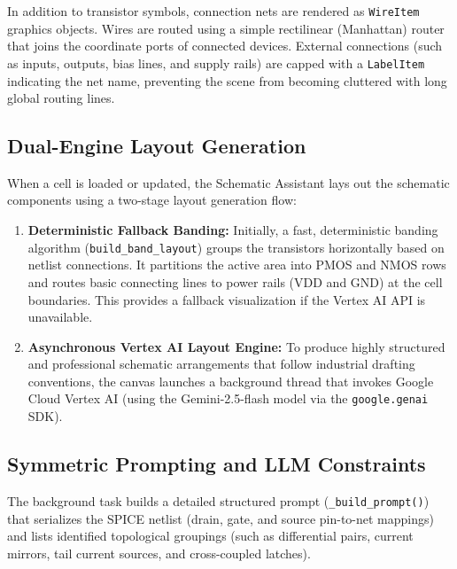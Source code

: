\noindent
In addition to transistor symbols, connection nets are rendered as \texttt{WireItem} graphics objects. Wires are routed using a simple rectilinear (Manhattan) router that joins the coordinate ports of connected devices. External connections (such as inputs, outputs, bias lines, and supply rails) are capped with a \texttt{LabelItem} indicating the net name, preventing the scene from becoming cluttered with long global routing lines.

\subsection{Dual-Engine Layout Generation}
\noindent
When a cell is loaded or updated, the Schematic Assistant lays out the schematic components using a two-stage layout generation flow:
\begin{enumerate}
    \item \textbf{Deterministic Fallback Banding:} Initially, a fast, deterministic banding algorithm (\texttt{build\_band\_layout}) groups the transistors horizontally based on netlist connections. It partitions the active area into PMOS and NMOS rows and routes basic connecting lines to power rails (VDD and GND) at the cell boundaries. This provides a fallback visualization if the Vertex AI API is unavailable.
    \item \textbf{Asynchronous Vertex AI Layout Engine:} To produce highly structured and professional schematic arrangements that follow industrial drafting conventions, the canvas launches a background thread that invokes Google Cloud Vertex AI (using the Gemini-2.5-flash model via the \texttt{google.genai} SDK).
\end{enumerate}

\subsection{Symmetric Prompting and LLM Constraints}
\noindent
The background task builds a detailed structured prompt (\texttt{\_build\_prompt()}) that serializes the SPICE netlist (drain, gate, and source pin-to-net mappings) and lists identified topological groupings (such as differential pairs, current mirrors, tail current sources, and cross-coupled latches). 

